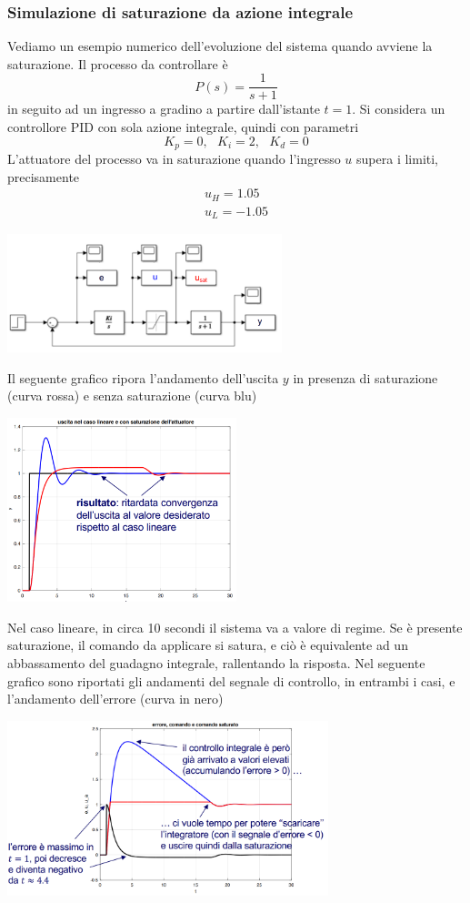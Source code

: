\documentclass[10pt, letterpaper]{report}
\begin{document}
\subsubsection{Simulazione di saturazione da azione integrale}
Vediamo un esempio numerico dell'evoluzione del sistema quando avviene la saturazione. Il processo da controllare è 
$$P(s)=\frac{1}{s+1} $$
in seguito ad un ingresso a gradino a partire dall'istante $t=1$. Si considera un controllore PID con sola azione integrale, quindi con parametri 
$$K_p=0,\ \ \  K_i=2,\ \ \ K_d=0$$
L'attuatore del processo va in saturazione quando l'ingresso $u$ supera i limiti, precisamente 
$$ \begin{matrix}
    u_H=1.05\\ 
    u_L=-1.05
\end{matrix}$$
\begin{center}
    \includegraphics[width=0.6\textwidth]{images/esempio2.png}
\end{center}
Il seguente grafico ripora l'andamento dell'uscita $y$ in presenza di saturazione (curva rossa) e senza saturazione (curva blu)
\begin{center}
    \includegraphics[width=0.5\textwidth]{images/saturazioneCurve.png}
\end{center}
Nel caso lineare, in circa 10 secondi il sistema va a valore di regime. Se è presente saturazione, il comando da applicare si satura, e ciò è equivalente ad un abbassamento del guadagno integrale, rallentando la risposta. Nel seguente grafico sono riportati gli andamenti del segnale di controllo, in entrambi i casi, e l'andamento dell'errore (curva in nero)
\begin{center}
    \includegraphics[width=0.7\textwidth]{images/saturazioneCurve2.png}
\end{center}
\end{document}
